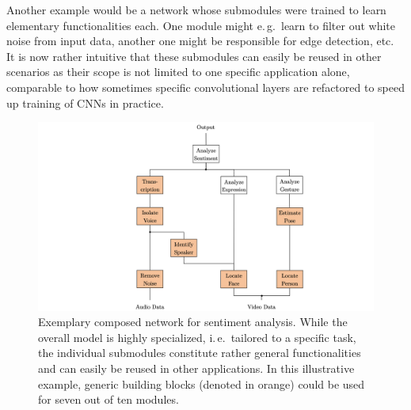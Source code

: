 \begin{itemize}
    Another example would be a network whose submodules were trained to learn elementary functionalities each. One module might e.\,g.\ learn to filter out white noise from input data, another one might be responsible for edge detection, etc. It is now rather intuitive that these submodules can easily be reused in other scenarios as their scope is not limited to one specific application alone, comparable to how sometimes specific convolutional layers are refactored to speed up training of CNNs in practice.
    
\begin{figure}[tb]
    \centering
	    \includegraphics[width=\textwidth, trim=250 0 250 0, clip]{thesis/graphics/graphics/transferability.jpeg}
    \caption{Exemplary composed network for sentiment analysis. While the overall model is highly specialized, i.\,e.\ tailored to a specific task, the individual submodules constitute rather general functionalities and can easily be reused in other applications. In this illustrative example, generic building blocks (denoted in orange) could be used for seven out of ten modules.}
    \label{fig:modularization_transferability}
\end{figure}


\end{itemize}
